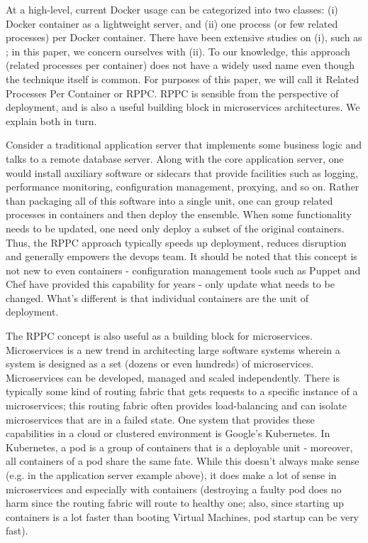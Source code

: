 \documentclass[conference]{IEEEtran}
\begin{document}
At a high-level, current Docker usage can be categorized into two classes: (i) Docker container as a lightweight server, and (ii) one process (or few related processes) per Docker container. There have been extensive studies on (i), such as \cite{Felter_2014}; in this paper, we concern ourselves with (ii). To our knowledge, this approach (related processes per container) does not have a widely used name even though the technique itself is common. For purposes of this paper, we will call it Related Processes Per Container or RPPC. RPPC is sensible from the perspective of deployment, and is also a useful building block in microservices architectures. We explain both in turn.

Consider a traditional application server that implements some business logic and talks to a remote database server. Along with the core application server, one would install auxiliary software or sidecars that provide facilities such as logging, performance monitoring, configuration management, proxying, and so on. Rather than packaging all of this software into a single unit, one can group related processes in containers and then deploy the ensemble. When some functionality needs to be updated, one need only deploy a subset of the original containers. Thus, the RPPC approach typically speeds up deployment, reduces disruption and generally empowers the devops team. It should be noted that this concept is not new to even containers - configuration management tools such as Puppet and Chef have provided this capability for years - only update what needs to be changed. What's different is that individual containers are the unit of deployment.

The RPPC concept is also useful as a building block for microservices. Microservices is a new trend in architecting large software systems wherein a system is designed as a set (dozens or even hundreds) of microservices. Microservices can be developed, managed and scaled independently. There is typically some kind of routing fabric that gets requests to a specific instance of a microservices; this routing fabric often provides load-balancing and can isolate microservices that are in a failed state. One system that provides these capabilities in a cloud or clustered environment is Google's Kubernetes. In Kubernetes, a pod is a group of containers that is a deployable unit - moreover, all containers of a pod share the same fate. While this doesn't always make sense (e.g. in the application server example above), it does make a lot of sense in microservices and especially with containers (destroying a faulty pod does no harm since the routing fabric will route to healthy one; also, since starting up containers is a lot faster than booting Virtual Machines, pod startup can be very fast).
\end{document}
